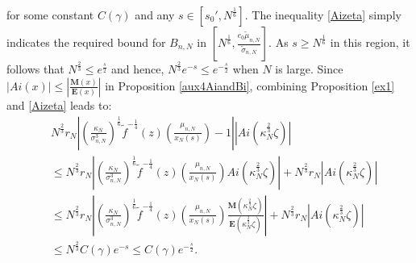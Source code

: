 \documentclass[11pt]{article}
\numberwithin{equation}{section}%
\numberwithin{theorem}{section}
\begin{document}
     for some constant $C(\gamma)$ and any $s\in\left[s_0',N^{\frac{1}{6}}\right]$. The inequality \eqref{Aizeta} simply indicates the required bound for $B_{n,N}$ in $\left[N^\frac{1}{6},\frac{e_0\tilde\mu_{n,N}}{\tilde\sigma_{n,N}}\right]$. As $s\ge N^\frac{1}{6}$ in this region, it follows that $N^\frac{2}{3}\le e^\frac{s}{2}$ and hence, $N^\frac{2}{3}e^{-s}\le e^{-\frac{s}{2}}$ when $N$ is large. Since $|Ai(x)|\le\left|\frac{\mathbf{M}(x)}{\mathbf{E}(x)}\right|$ in Proposition \ref{aux4AiandBi}, combining Proposition \ref{ex1} and \eqref{Aizeta} leads to:
     \begin{equation}\label{2nd4B}
         \begin{split}
             &N^\frac{2}{3}r_N\left|\left(\frac{\kappa_N}{\sigma_{n,N}^3}\right)^{\frac{1}{6}}\tilde{f}^{-\frac{1}{4}}(z)
\left(\frac{\mu_{n,N}}{x_N(s)}\right)-1\right|\left|Ai\left(\kappa_N^{\frac{2}{3}}\zeta\right)\right|\\
&\le N^\frac{2}{3}r_N\left|\left(\frac{\kappa_N}{\sigma_{n,N}^3}\right)^{\frac{1}{6}}\tilde{f}^{-\frac{1}{4}}(z)
\left(\frac{\mu_{n,N}}{x_N(s)}\right)Ai\left(\kappa_N^{\frac{2}{3}}\zeta\right)\right|+N^\frac{2}{3}r_N\left|Ai\left(\kappa_N^{\frac{2}{3}}\zeta\right)\right|\\
&\le N^\frac{2}{3}r_N\left|\left(\frac{\kappa_N}{\sigma_{n,N}^3}\right)^{\frac{1}{6}}\tilde{f}^{-\frac{1}{4}}(z)
\left(\frac{\mu_{n,N}}{x_N(s)}\right)\frac{\mathbf{M}\left(\kappa_N^{\frac{2}{3}}\zeta\right)}{\mathbf{E}\left(\kappa_N^{\frac{2}{3}}\zeta\right)}\right|+N^\frac{2}{3}r_N\left|Ai\left(\kappa_N^{\frac{2}{3}}\zeta\right)\right|\\
&\le N^\frac{2}{3}C(\gamma)e^{-s}\le C(\gamma)e^{-\frac{s}{2}}.
         \end{split}
     \end{equation}
\end{document}
